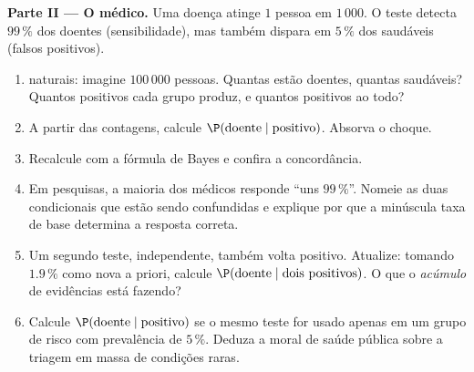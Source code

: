 \begin{problem}
\medskip
\noindent\textbf{Parte II --- O médico.}
Uma doença atinge $1$ pessoa em $1\,000$. O teste detecta
$99\,\%$ dos doentes (sensibilidade), mas também dispara em
$5\,\%$ dos saudáveis (falsos positivos).
\begin{enumerate}[resume]
  \item {} naturais: imagine $100\,000$ pessoas.
        Quantas estão doentes, quantas saudáveis? Quantos
        positivos cada grupo produz, e quantos positivos ao
        todo?
  \item A partir das contagens, calcule
        $\P(\text{doente} \mid \text{positivo})$. Absorva o
        choque.
  \item Recalcule com a fórmula de Bayes e confira a
        concordância.
  \item Em pesquisas, a maioria dos médicos responde ``uns
        $99\,\%$''. Nomeie as duas  condicionais
        que estão sendo confundidas e explique por que a
        minúscula taxa de base determina a resposta correta.
  \item Um segundo teste, independente, também volta positivo.
        Atualize: tomando $1.9\,\%$ como nova  a
        priori, calcule
        $\P(\text{doente} \mid \text{dois positivos})$. O que o
        \emph{acúmulo} de evidências está fazendo?
  \item Calcule $\P(\text{doente} \mid \text{positivo})$ se o
        mesmo teste for usado apenas em um grupo de risco com
        prevalência de $5\,\%$. Deduza a moral de saúde pública
        sobre a triagem em massa de condições raras.
\end{enumerate}


\end{problem}
